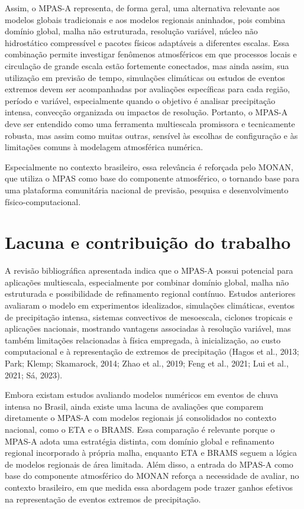 \documentclass[12pt,a4paper,oneside]{book}
\begin{document}
Assim, o MPAS-A representa, de forma geral, uma alternativa relevante aos modelos globais tradicionais e aos modelos regionais aninhados, pois combina domínio global, malha não estruturada, resolução variável, núcleo não hidrostático compressível e pacotes físicos adaptáveis a diferentes escalas. Essa combinação permite investigar fenômenos atmosféricos em que processos locais e circulação de grande escala estão fortemente conectados, mas ainda assim, sua utilização em previsão de tempo, simulações climáticas ou estudos de eventos extremos devem ser acompanhadas por avaliações específicas para cada região, período e variável, especialmente quando o objetivo é analisar precipitação intensa, convecção organizada ou impactos de resolução. Portanto, o MPAS-A deve ser entendido como uma ferramenta multiescala promissora e tecnicamente robusta, mas assim como muitas outras, sensível às escolhas de configuração e às limitações comuns à modelagem atmosférica numérica.

Especialmente no contexto brasileiro, essa relevância é reforçada pelo MONAN, que utiliza o MPAS como base do componente atmosférico, o tornando base para uma plataforma comunitária nacional de previsão, pesquisa e desenvolvimento físico-computacional.

\chapter{Lacuna e contribuição do trabalho}

A revisão bibliográfica apresentada indica que o MPAS-A possui potencial para aplicações multiescala, especialmente por combinar domínio global, malha não estruturada e possibilidade de refinamento regional contínuo. Estudos anteriores avaliaram o modelo em experimentos idealizados, simulações climáticas, eventos de precipitação intensa, sistemas convectivos de mesoescala, ciclones tropicais e aplicações nacionais, mostrando vantagens associadas à resolução variável, mas também limitações relacionadas à física empregada, à inicialização, ao custo computacional e à representação de extremos de precipitação (Hagos et al., 2013; Park; Klemp; Skamarock, 2014; Zhao et al., 2019; Feng et al., 2021; Lui et al., 2021; Sá, 2023).

Embora existam estudos avaliando modelos numéricos em eventos de chuva intensa no Brasil, ainda existe uma lacuna de avaliações que comparem diretamente o MPAS-A com modelos regionais já consolidados no contexto nacional, como o ETA e o BRAMS. Essa comparação é relevante porque o MPAS-A adota uma estratégia distinta, com domínio global e refinamento regional incorporado à própria malha, enquanto ETA e BRAMS seguem a lógica de modelos regionais de área limitada. Além disso, a entrada do MPAS-A como base do componente atmosférico do MONAN reforça a necessidade de avaliar, no contexto brasileiro, em que medida essa abordagem pode trazer ganhos efetivos na representação de eventos extremos de precipitação.
\end{document}
